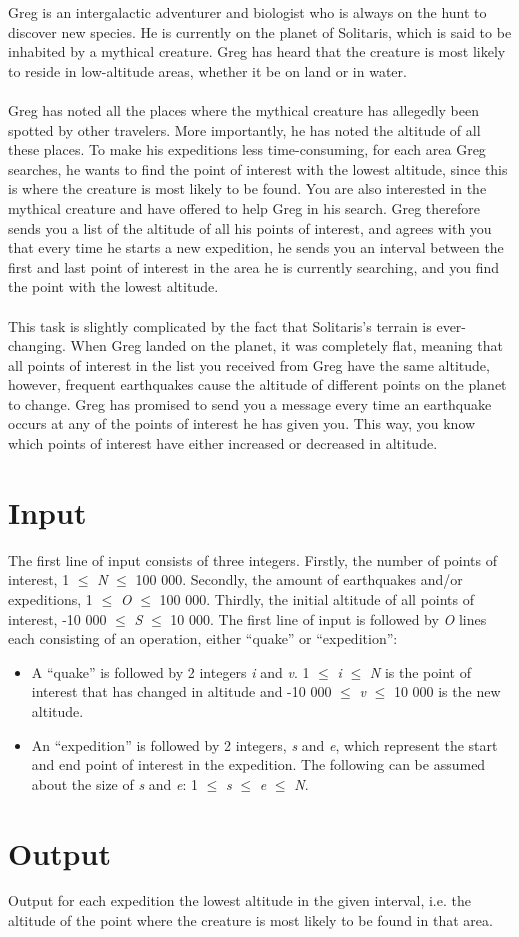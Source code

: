 Greg is an intergalactic adventurer and biologist who is always on the hunt to discover new species. He is currently on the planet of Solitaris, which is said to be inhabited by a mythical creature. Greg has heard that the creature is most likely to reside in low-altitude areas, whether it be on land or in water.
\\\\
Greg has noted all the places where the mythical creature has allegedly been spotted by other travelers. More importantly, he has noted the altitude of all these places. To make his expeditions less time-consuming, for each area Greg searches, he wants to find the point of interest with the lowest altitude, since this is where the creature is most likely to be found. You are also interested in the mythical creature and have offered to help Greg in his search. Greg therefore sends you a list of the altitude of all his points of interest, and agrees with you that every time he starts a new expedition, he sends you an interval between the first and last point of interest in the area he is currently searching, and you find the point with the lowest altitude.
\\\\
This task is slightly complicated by the fact that Solitaris’s terrain is ever-changing. When Greg landed on the planet, it was completely flat, meaning that all points of interest in the list you received from Greg have the same altitude, however, frequent earthquakes cause the altitude of different points on the planet to change. Greg has promised to send you a message every time an earthquake occurs at any of the points of interest he has given you. This way, you know which points of interest have either increased or decreased in altitude.
\section*{Input}
The first line of input consists of three integers. Firstly, the number of points of interest, 1 $\leq$ \emph{N} $\leq$ 100 000. Secondly, the amount of earthquakes and/or expeditions, 1 $\leq$ \emph{O} $\leq$ 100 000. Thirdly, the initial altitude of all points of interest, -10 000 $\leq$ \emph{S} $\leq$ 10 000. The first line of input is followed by \emph{O} lines each consisting of an operation, either “quake” or “expedition”:
\begin{itemize}
    \item A “quake” is followed by 2 integers \emph{i} and \emph{v}. 1 $\leq$ \emph{i} $\leq$ \emph{N} is the point of interest that has changed in altitude and -10 000 $\leq$ \emph{v} $\leq$ 10 000 is the new altitude.
    \item An “expedition” is followed by 2 integers, \emph{s} and \emph{e}, which represent the start and end point of interest in the expedition. The following can be assumed about the size of \emph{s} and \emph{e}: 1 $\leq$ \emph{s} $\leq$ \emph{e} $\leq$ \emph{N}.
\end{itemize}
\section*{Output}
Output for each expedition the lowest altitude in the given interval, i.e. the altitude of the point where the creature is most likely to be found in that area.
\\